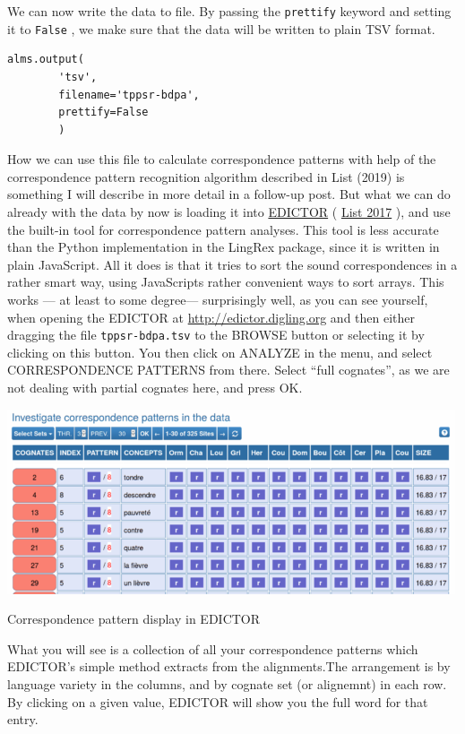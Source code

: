 \documentclass[
  a4paper,
  14pt,
  oneside,
  tablecaptionabove
]{scrbook}
\newcommand{\passthrough}[1]{#1}
\begin{document}
We can now write the data to file. By passing the
\passthrough{\lstinline!prettify!} keyword and setting it to
\passthrough{\lstinline!False!} , we make sure that the data will be
written to plain TSV format.

\begin{lstlisting}
alms.output(
        'tsv',
        filename='tppsr-bdpa',
        prettify=False
        )
\end{lstlisting}

How we can use this file to calculate correspondence patterns with help
of the correspondence pattern recognition algorithm described in List
(2019) is something I will describe in more detail in a follow-up post.
But what we can do already with the data by now is loading it into
\href{http://edictor.digling.org}{EDICTOR} (
\href{http://bibliography.lingpy.org?key=List2017d}{List 2017} ), and
use the built-in tool for correspondence pattern analyses. This tool is
less accurate than the Python implementation in the LingRex package,
since it is written in plain JavaScript. All it does is that it tries to
sort the sound correspondences in a rather smart way, using JavaScripts
rather convenient ways to sort arrays. This works --- at least to some
degree--- surprisingly well, as you can see yourself, when opening the
EDICTOR at \url{http://edictor.digling.org} and then either dragging the
file \passthrough{\lstinline!tppsr-bdpa.tsv!} to the BROWSE button or
selecting it by clicking on this button. You then click on ANALYZE in
the menu, and select CORRESPONDENCE PATTERNS from there. Select
\enquote{full cognates}, as we are not dealing with partial cognates
here, and press OK.

\leavevmode\hypertarget{attachment_1809}{}%
\includegraphics[width=5.20833in,height=2.14583in]{images/__f-origin.hypotheses.org_wp-content_blogs.dir_4500_files_2019_02_edictor1-500x206.png}

Correspondence pattern display in EDICTOR

What you will see is a collection of all your correspondence patterns
which EDICTOR's simple method extracts from the alignments.The
arrangement is by language variety in the columns, and by cognate set
(or alignemnt) in each row. By clicking on a given value, EDICTOR will
show you the full word for that entry.
\end{document}
